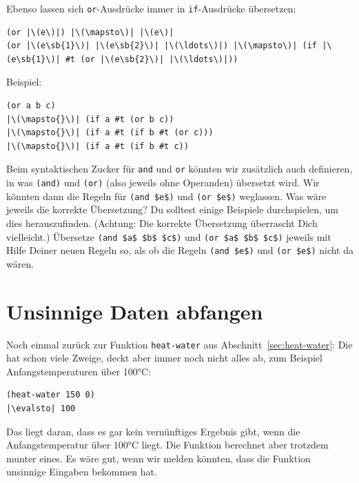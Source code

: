 Ebenso lassen sich \lstinline{or}-Ausdrücke immer in
\lstinline{if}-Ausdrücke übersetzen:
%
\begin{lstlisting}
(or |\(e\)|) |\(\mapsto\)| |\(e\)|
(or |\(e\sb{1}\)| |\(e\sb{2}\)| |\(\ldots\)|) |\(\mapsto\)| (if |\(e\sb{1}\)| #t (or |\(e\sb{2}\)| |\(\ldots\)|))
\end{lstlisting}
%
Beispiel:
%
\begin{lstlisting}
(or a b c)
|\(\mapsto{}\)| (if a #t (or b c))
|\(\mapsto{}\)| (if a #t (if b #t (or c)))
|\(\mapsto{}\)| (if a #t (if b #t c))
\end{lstlisting}
%
\begin{aufgabeinline}
  Beim syntaktischen Zucker für \lstinline{and} und \lstinline{or} könnten
  wir zusätzlich auch definieren, in was \lstinline{(and)} und \lstinline{(or)} (also
  jeweils ohne Operanden) übersetzt wird.  Wir könnten dann die Regeln
  für \lstinline{(and $e$)} und \lstinline{(or $e$)} weglassen. Was wäre jeweils die
  korrekte Übersetzung?  Du solltest einige Beispiele durchspielen, um
  dies herauszufinden.  (Achtung: Die korrekte Übersetzung überrascht
  Dich vielleicht.)  Übersetze \lstinline{(and $a$ $b$ $c$)} und
  \lstinline{(or $a$ $b$ $c$)} jeweils mit Hilfe Deiner neuen Regeln so, als ob die Regeln
  \lstinline{(and $e$)} und \lstinline{(or $e$)} nicht da wären.
\end{aufgabeinline}

\section{Unsinnige Daten abfangen}
\label{sec:nonsensical-data}

Noch einmal zurück zur Funktion \lstinline{heat-water} aus
Abschnitt~\ref{sec:heat-water}: Die hat schon viele Zweige,
deckt aber immer noch nicht alles ab, zum Beispiel
Anfangstemperaturen über 100\si{\degree}C:
%
\begin{lstlisting}
(heat-water 150 0)
|\evalsto| 100
\end{lstlisting}
%
Das liegt daran, dass es gar kein vernünftiges Ergebnis gibt, wenn die
Anfangstemperatur über $100$\si{\degree}C liegt.  Die Funktion berechnet aber
trotzdem munter eines.  Es wäre gut, wenn wir melden
könnten, dass die Funktion unsinnige Eingaben bekommen hat.

